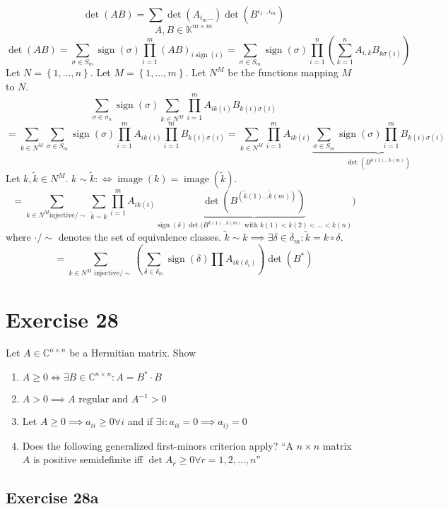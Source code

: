 \documentclass[a4paper]{article}
\theoremstyle{definition}
\DeclareMathOperator\image{image}
\DeclareMathOperator\sign{sign}
\newcommand\set[1]{\left\{#1\right\}}
\begin{document}
\[ \det(AB) = \sum \det(A_{i_m \ldots}) \det(B^{i_1 \ldots i_m}) \]
\[ A,B \in \mathbb K^{m \times m} \]
\[ \det(AB) = \sum_{\sigma \in S_m} \sign(\sigma) \prod_{i=1}^m (AB)_{i \sign(i)} =
  \sum_{\sigma \in S_m} \sign(\sigma) \prod_{i=1}^n \left(\sum_{k=1}^n A_{i,k} B_{k \sigma(i)} \right)
\]
Let $N = \set{1, \ldots, n}$. Let $M = \set{1, \ldots, m}$. Let $N^M$ be the functions mapping $M$ to $N$.
\[
  \sum _{\sigma \in \sigma_n} \sign(\sigma) \sum_{k \in N^M} \prod_{i=1}^m A_{i k(i)} B_{k(i) \sigma(i)}
\] \[
  = \sum_{k \in N^M} \sum_{\sigma \in S_m} \sign(\sigma) \prod_{i=1}^m A_{ik(i)} \prod_{i=1}^m B_{k(i) \sigma(i)}
  = \sum_{k \in N^M} \prod_{i=1}^m A_{i k(i)} \underbrace{\sum_{\sigma \in S_m} \sign(\sigma) \prod_{i=1}^m B_{k(i) \sigma(i)}}_{\det(B^{k(1) \ldots k(m)})}
\]
Let $k, \tilde k \in N^M$. $k \sim \tilde k :\iff \image(k) = \image(\tilde k)$.
\[ = \sum_{k \in N^M \text{injective} / \sim} \sum_{\tilde k \sim k} \prod_{i=1}^m A_{ik(i)} \underbrace{\det(B^{(\tilde k(1) \ldots \tilde k(m))})}_{\sign(\delta) \det(B^{k(1) \ldots k(m)} \text{ with } k(1) < k(2) < \ldots < k(n)}) \]
where $\cdot/\sim$ denotes the set of equivalence classes. $\tilde k \sim k \implies \exists \delta \in \delta_m: \tilde k = k \circ \delta$.
\[ = \sum_{k \in N^M \text{ injective} / \sim} \left(\sum_{\delta \in \delta_m} \sign(\delta) \prod A_{i k(\delta_i)}\right) \det(B^*) \]

\section*{Exercise 28}
\begin{ex}
  Let $A \in \mathbb C^{n \times n}$ be a Hermitian matrix. Show
  \begin{enumerate}
    \item $A \geq 0 \iff \exists B \in \mathbb C^{n \times n}: A = B^* \cdot B$
    \item $A > 0 \implies A \text{ regular and } A^{-1} > 0$
    \item Let $A \geq 0 \implies a_{ii} \geq 0 \forall i$ and if $\exists i: a_{ii} = 0 \implies a_{ij} = 0$
    \item Does the following generalized first-minors criterion apply?
      \enquote{A $n \times n$ matrix $A$ is positive semidefinite iff $\det{A_r} \geq 0 \forall r = 1, 2, \ldots, n$}
  \end{enumerate}
\end{ex}

\subsection{Exercise 28a}
\end{document}
